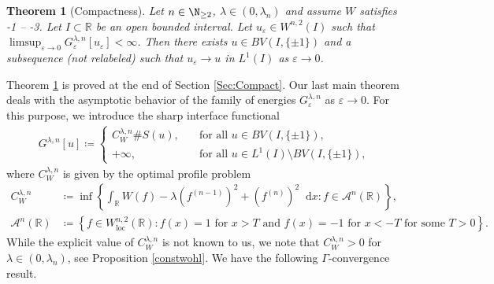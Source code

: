 \documentclass{article}
\newcommand{\dd}{\mathop{}\mathrm{d}} %
\newcommand{\lam}{\lambda}
\newcommand{\eps}{\varepsilon}
\numberwithin{figure}{section}
\def\AAA{{\mathcal A}} \def\calB{{\mathcal B}} \def\calC{{\mathcal C}}
\newcommand{\R}{\mathbb{R}}
\newtheorem{theorem}{Theorem}[section]
\numberwithin{equation}{section}
\begin{document}
\begin{theorem}[Compactness] \label{Theo:comp_n}
Let $n \in \N_{\geq2}$, $\lam \in (0,\lam_n)$ and assume $W$ satisfies \hyp1 -- \hyp3. Let $I \subset \R$ be an open bounded interval. Let $u_\eps \in W^{n,2}(I)$ such that $\limsup_{\eps\to 0} G_\eps^{\lam,n}[u_\eps] < \infty$. Then there exists $u \in BV(I,\{\pm1\})$ and a subsequence (not relabeled) such that $u_\eps \to u$ in $L^1(I)$ as $\eps \to 0$.
\end{theorem}

Theorem \ref{Theo:comp_n} is proved at the end of Section \ref{Sec:Compact}. Our last main theorem deals with the asymptotic behavior of the family of energies $G_\eps^{\lam,n}$ as $\eps \to 0$. For this purpose, we introduce the sharp interface functional
    \begin{align}  \label{Gammalimes}
        G^{\lam,n}[u] \coloneqq \left\{\begin{array}{ll}
            C_W^{\lam,n} \#S(u),    & \quad \text{for all } u \in BV(I,\{\pm1\}), \\
            +\infty,                & \quad \text{for all } u \in L^1(I) \setminus BV(I,\{\pm1\}),
        \end{array}\right.
    \end{align}
where $C_W^{\lam,n}$ is given by the optimal profile problem
    \begin{align}
        C_W^{\lam,n}    & \coloneqq \inf\left\{\int_\R W(f) - \lam(f^{(n-1)})^2 + (f^{(n)})^2\dd x : f \in \AAA^n(\R) \right\}, \\
        \AAA^n(\R)      & \coloneqq \left\{ f \in W^{n,2}_{\mathrm{loc}}(\R) \colon f(x) = 1 \text{ for } x > T \text{ and } f(x) = -1 \text{ for } x < -T  \text{ for some } T>0 \right\}.
    \end{align}
While the explicit value of $C_W^{\lam,n}$ is not known to us, we note that $C_W^{\lam,n} > 0$ for $\lam \in(0,\lam_n)$, see Proposition \ref{constwohl}. We have the following $\Gamma$-convergence result.
\end{document}
